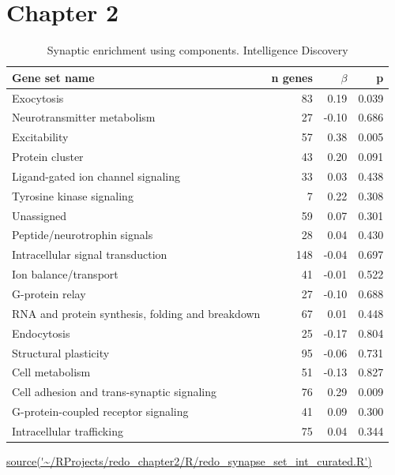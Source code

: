 \section{Chapter 2}

\begin{table}[ht]
\centering
\begin{tabular}{lrrr}
  \toprule
Gene set name & n genes & $\beta$ & p \\ 
  \midrule
Exocytosis & 83 & 0.19 & 0.039 \\ 
  Neurotransmitter metabolism & 27 & -0.10 & 0.686 \\ 
  Excitability & 57 & 0.38 & 0.005 \\ 
  Protein cluster & 43 & 0.20 & 0.091 \\ 
  Ligand-gated ion channel signaling & 33 & 0.03 & 0.438 \\ 
  Tyrosine kinase signaling & 7 & 0.22 & 0.308 \\ 
  Unassigned & 59 & 0.07 & 0.301 \\ 
  Peptide/neurotrophin signals & 28 & 0.04 & 0.430 \\ 
  Intracellular signal transduction & 148 & -0.04 & 0.697 \\ 
  Ion balance/transport & 41 & -0.01 & 0.522 \\ 
  G-protein relay & 27 & -0.10 & 0.688 \\ 
  RNA and protein synthesis, folding and breakdown & 67 & 0.01 & 0.448 \\ 
  Endocytosis & 25 & -0.17 & 0.804 \\ 
  Structural plasticity & 95 & -0.06 & 0.731 \\ 
  Cell metabolism & 51 & -0.13 & 0.827 \\ 
  Cell adhesion and trans-synaptic signaling & 76 & 0.29 & 0.009 \\ 
  G-protein-coupled receptor signaling & 41 & 0.09 & 0.300 \\ 
  Intracellular trafficking & 75 & 0.04 & 0.344 \\ 
   \bottomrule
\end{tabular}
\caption{Synaptic enrichment using components. Intelligence Discovery} \tiny\url{source('~/RProjects/redo_chapter2/R/redo_synapse_set_int_curated.R')} 
\label{tab:MAGMA enrichment of synaptic groups UKBBint}
\end{table}


